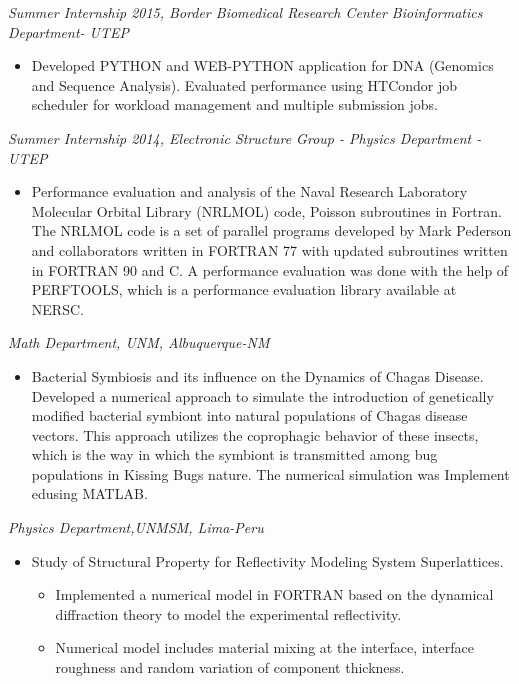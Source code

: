 \documentclass[margin]{res}
\begin{document}
\begin{resume}
{\sl Summer Internship 2015, Border Biomedical Research Center Bioinformatics Department- UTEP} %
\begin{itemize}\itemsep -2pt
\item Developed PYTHON and WEB-PYTHON application for DNA (Genomics and Sequence Analysis). 
Evaluated performance using HTCondor job scheduler for workload management and multiple submission jobs. 
\end{itemize}
%
{\sl Summer Internship 2014,  Electronic Structure Group - Physics Department - UTEP} %
\begin{itemize}\itemsep -2pt
\item Performance evaluation and analysis of the Naval Research Laboratory Molecular Orbital Library (NRLMOL) code, Poisson subroutines in Fortran.
The NRLMOL code is a set of parallel programs developed by Mark Pederson and collaborators written in FORTRAN 77
with updated subroutines written in FORTRAN 90 and C. A performance evaluation was done with the help of PERFTOOLS, which is a performance evaluation library available at NERSC.
\end{itemize} 
%
{\sl Math Department, UNM, Albuquerque-NM}%
\begin{itemize}  \itemsep -2pt %
\item Bacterial Symbiosis and its influence on the Dynamics of Chagas Disease.
Developed a numerical approach to simulate the introduction of genetically modified bacterial symbiont into natural populations of Chagas disease vectors.
This approach utilizes the coprophagic behavior of these insects, which is the way in which the symbiont is transmitted among
bug populations in Kissing Bugs nature. The numerical simulation was Implement edusing  MATLAB.
\end{itemize}
%
{\sl Physics Department,UNMSM, Lima-Peru} %
\begin{itemize}\itemsep -2pt
\item Study of Structural Property for Reflectivity Modeling System Superlattices.
\begin{itemize}
\item Implemented a numerical model in FORTRAN  based on the dynamical diffraction theory to model the experimental reflectivity.
\item Numerical model includes material mixing at the interface, interface roughness and random variation of component thickness.

\end{itemize}
\end{itemize}
\end{resume}
\end{document}
